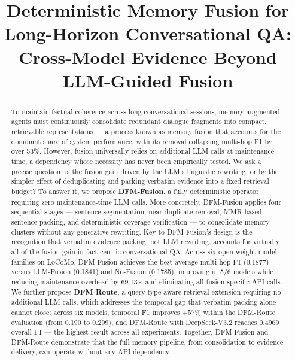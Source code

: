 \documentclass{article} %
\title{Deterministic Memory Fusion for Long-Horizon Conversational QA: Cross-Model Evidence Beyond LLM-Guided Fusion}
\author{}
\theoremstyle{plain}
\theoremstyle{definition}
\theoremstyle{remark}
\begin{document}
\maketitle

\begin{abstract}
To maintain factual coherence across long conversational sessions, memory-augmented agents must continuously consolidate redundant dialogue fragments into compact, retrievable representations --- a process known as memory fusion that accounts for the dominant share of system performance, with its removal collapsing multi-hop F1 by over 53\%. However, fusion universally relies on additional LLM calls at maintenance time, a dependency whose necessity has never been empirically tested. We ask a precise question: is the fusion gain driven by the LLM's linguistic rewriting, or by the simpler effect of deduplicating and packing verbatim evidence into a fixed retrieval budget? To answer it, we propose \textbf{DFM-Fusion}, a fully deterministic operator requiring zero maintenance-time LLM calls. More concretely, DFM-Fusion applies four sequential stages --- sentence segmentation, near-duplicate removal, MMR-based sentence packing, and deterministic coverage verification --- to consolidate memory clusters without any generative rewriting. Key to DFM-Fusion's design is the recognition that verbatim evidence packing, not LLM rewriting, accounts for virtually all of the fusion gain in fact-centric conversational QA. Across six open-weight model families on LoCoMo, DFM-Fusion achieves the best average multi-hop F1 (0.1877) versus LLM-Fusion (0.1841) and No-Fusion (0.1785), improving in 5/6 models while reducing maintenance overhead by 69.13$\times$ and eliminating all fusion-specific API calls. We further propose \textbf{DFM-Route}, a query-type-aware retrieval extension requiring no additional LLM calls, which addresses the temporal gap that verbatim packing alone cannot close: across six models, temporal F1 improves $+57\%$ within the DFM-Route evaluation (from 0.190 to 0.299), and DFM-Route with DeepSeek-V3.2 reaches 0.4969 overall F1 --- the highest result across all experiments. Together, DFM-Fusion and DFM-Route demonstrate that the full memory pipeline, from consolidation to evidence delivery, can operate without any API dependency.
\end{abstract}













\appendix




\end{document}
